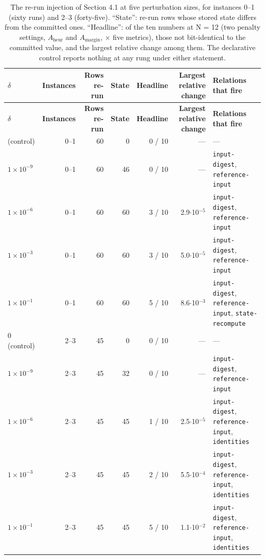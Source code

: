 \documentclass[acmsmall,screen,review]{acmart}
\begin{document}
\begingroup
\small
\setlength\LTleft{\fill}
\setlength\LTright{\fill}
\begin{xltabular}{\textwidth}{lrrrrrY}
\caption{The re-run injection of Section 4.1 at five perturbation sizes, for instances 0--1 (sixty runs) and 2--3 (forty-five). ``State'': re-run rows whose stored state differs from the committed ones. ``Headline'': of the ten numbers at N = 12 (two penalty settings, $A_{\mathrm{heur}}$ and $A_{\mathrm{margin}}$, $\times$ five metrics), those not bit-identical to the committed value, and the largest relative change among them. The declarative control reports nothing at any rung under either statement.}\label{tab:6} \\
\toprule
\textbf{$\delta$} & \textbf{Instances} & \textbf{Rows re-run} & \textbf{State} & \textbf{Headline} & \textbf{Largest relative change} & \textbf{Relations that fire} \\
\midrule
\endfirsthead
\toprule
\textbf{$\delta$} & \textbf{Instances} & \textbf{Rows re-run} & \textbf{State} & \textbf{Headline} & \textbf{Largest relative change} & \textbf{Relations that fire} \\
\midrule
\endhead
\endfoot
\bottomrule
{} (control) & 0--1 & 60 & 0 & 0 / 10 & --- & --- \\*
$1\times 10^{-9}$ & 0--1 & 60 & 46 & 0 / 10 & --- & \texttt{input-digest}, \texttt{reference-input} \\*
$1\times 10^{-6}$ & 0--1 & 60 & 60 & 3 / 10 & 2.9$\cdot$10$^{-5}$ & \texttt{input-digest}, \texttt{reference-input} \\*
$1\times 10^{-3}$ & 0--1 & 60 & 60 & 3 / 10 & 5.0$\cdot$10$^{-5}$ & \texttt{input-digest}, \texttt{reference-input} \\*
$1\times 10^{-1}$ & 0--1 & 60 & 60 & 5 / 10 & 8.6$\cdot$10$^{-3}$ & \texttt{input-digest}, \texttt{reference-input}, \texttt{state-recompute} \\*
0 (control) & 2--3 & 45 & 0 & 0 / 10 & --- & --- \\*
$1\times 10^{-9}$ & 2--3 & 45 & 32 & 0 / 10 & --- & \texttt{input-digest}, \texttt{reference-input} \\*
$1\times 10^{-6}$ & 2--3 & 45 & 45 & 1 / 10 & 2.5$\cdot$10$^{-5}$ & \texttt{input-digest}, \texttt{reference-input}, \texttt{identities} \\*
$1\times 10^{-3}$ & 2--3 & 45 & 45 & 2 / 10 & 5.5$\cdot$10$^{-4}$ & \texttt{input-digest}, \texttt{reference-input}, \texttt{identities} \\*
$1\times 10^{-1}$ & 2--3 & 45 & 45 & 5 / 10 & 1.1$\cdot$10$^{-2}$ & \texttt{input-digest}, \texttt{reference-input}, \texttt{identities} \\
\end{xltabular}
\endgroup
\end{document}
